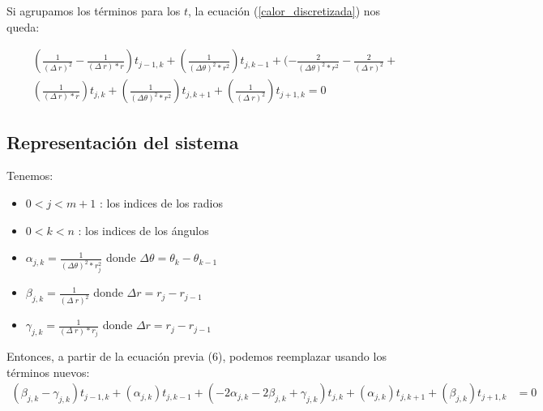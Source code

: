 Si agrupamos los términos para los $t$, la ecuación (\ref{calor_discretizada}) nos queda:

\begin{equation}
   \begin{aligned}
    &(\frac{1}{(\Delta\ r)^2} - \frac{1}{(\Delta\ r) * r})t_{j-1,k} + (\frac{1}{(\Delta\theta)^2 * r^2})t_{j,k-1} +  (-\frac{2}{(\Delta\theta)^2 * r^2}-\frac{2}{(\Delta\ r)^2} +\\
    &(\frac{1} {(\Delta\ r) * r})t_{j,k} + (\frac{1}{(\Delta\theta)^2 * r^2})t_{j,k+1} + (\frac{1}{(\Delta\ r)^2})t_{j+1,k} = 0
    \end{aligned}
\end{equation}

\subsection{Representación del sistema}

Tenemos:
\begin{itemize}
    \item $0 < j < m+1$ : los indices de los radios
    \item $0 < k < n$ : los indices de los ángulos
    \item $\alpha_{j,k} = \frac{1}{(\Delta\theta)^2 * r_{j}^2}$ donde $\Delta\theta = \theta_{k}-\theta_{k-1}$
    \item $\beta_{j,k} = \frac{1}{(\Delta\ r)^2}$ donde $\Delta r = r_{j}-r_{j-1}$
    \item $\gamma_{j,k} = \frac{1}{(\Delta\ r) * r_j}$ donde $\Delta r = r_{j}-r_{j-1}$
\end{itemize}

Entonces, a partir de la ecuación previa (6), podemos reemplazar usando los términos nuevos:
\begin{equation}
   \begin{aligned}
      (\beta_{j,k} - \gamma_{j,k})t_{j-1,k} +
      (\alpha_{j,k})t_{j,k-1} +
      (-2\alpha_{j,k}-2\beta_{j,k}+\gamma_{j,k})t_{j,k} +
      (\alpha_{j,k})t_{j,k+1} +
      (\beta_{j,k})t_{j+1,k} &= 0\\
    \end{aligned}
\end{equation}


